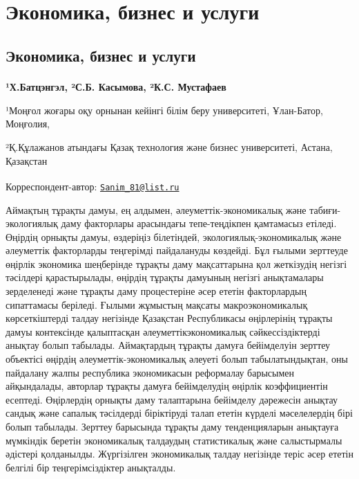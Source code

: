 \newpage
\let\cleardoublepage\clearpage
\part{Экономика, бизнес и услуги}
\let\cleardoublepage\clearpage
\chapter{Экономика, бизнес и услуги}

\begin{articleheader}

{\bfseries ¹Х.Батцэнгэл\textsuperscript{\envelope }, ²С.Б. Касымова, ²К.С.
Мустафаев}
\end{articleheader}
\begin{affiliation}
¹Моңғол жоғары оқу орнынан кейінгі білім беру университеті, Ұлан-Батор,
Моңғолия,

²Қ.Құлажанов атындағы Қазақ технология және бизнес университеті, Астана,
Қазақстан

\raggedright {\bfseries \textsuperscript{\envelope }}Корреспондент-автор: \href{mailto:Sanim_81@list.ru}{\nolinkurl{Sanim\_81@list.ru}}
\end{affiliation}

Аймақтың тұрақты дамуы, ең алдымен, әлеуметтік-экономикалық және
табиғи-экологиялық даму факторлары арасындағы тепе-теңдікпен қамтамасыз
етіледі. Өңірдің орнықты дамуы, өздеріңіз білетіндей,
экологиялық-экономикалық және әлеуметтік факторларды теңгерімді
пайдалануды көздейді. Бұл ғылыми зерттеуде өңірлік экономика шеңберінде
тұрақты даму мақсаттарына қол жеткізудің негізгі тәсілдері
қарастырылады, өңірдің тұрақты дамуының негізгі анықтамалары зерделенеді
және тұрақты даму процестеріне әсер ететін факторлардың сипаттамасы
беріледі. Ғылыми жұмыстың мақсаты макроэкономикалық көрсеткіштерді
талдау негізінде Қазақстан Республикасы өңірлерінің тұрақты дамуы
контексінде қалыптасқан әлеуметтік\-экономикалық сәйкессіздіктерді
анықтау болып табылады. Аймақтардың тұрақты дамуға бейімделуін зерттеу
объектісі өңірдің әлеуметтік-экономикалық әлеуеті болып табылатындықтан,
оны пайдалану жалпы республика экономикасын реформалау барысымен
айқындалады, авторлар тұрақты дамуға бейімделудің өңірлік коэффициентін
есептеді. Өңірлердің орнықты даму талаптарына бейімделу дәрежесін
анықтау сандық және сапалық тәсілдерді біріктіруді талап ететін күрделі
мәселелердің бірі болып табылады. Зерттеу барысында тұрақты даму
тенденцияларын анықтауға мүмкіндік беретін экономикалық талдаудың
статистикалық және салыстырмалы әдістері қолданылды. Жүргізілген
экономикалық талдау негізінде теріс әсер ететін белгілі бір
теңгерімсіздіктер анықталды.

